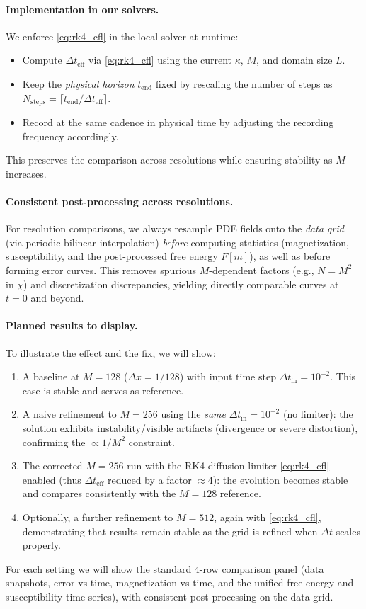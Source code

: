 \documentclass[11pt,a4paper]{article}
\begin{document}
\paragraph{Implementation in our solvers.} We enforce \eqref{eq:rk4_cfl} in the local solver at runtime:
\begin{itemize}
  \item Compute $\Delta t_\text{eff}$ via \eqref{eq:rk4_cfl} using the current $\kappa$, $M$, and domain size $L$.
  \item Keep the \emph{physical horizon} $t_\text{end}$ fixed by rescaling the number of steps as $N_\text{steps}=\lceil t_\text{end}/\Delta t_\text{eff}\rceil$.
  \item Record at the same cadence in physical time by adjusting the recording frequency accordingly.
\end{itemize}
This preserves the comparison across resolutions while ensuring stability as $M$ increases.

\paragraph{Consistent post-processing across resolutions.} For resolution comparisons, we always resample PDE fields onto the \emph{data grid} (via periodic bilinear interpolation) \emph{before} computing statistics (magnetization, susceptibility, and the post-processed free energy $F[m]$), as well as before forming error curves. This removes spurious $M$-dependent factors (e.g., $N=M^2$ in $\chi$) and discretization discrepancies, yielding directly comparable curves at $t=0$ and beyond.

\paragraph{Planned results to display.} To illustrate the effect and the fix, we will show:
\begin{enumerate}
  \item A baseline at $M=128$ ($\Delta x=1/128$) with input time step $\Delta t_\text{in}=10^{-2}$. This case is stable and serves as reference.
  \item A naive refinement to $M=256$ using the \emph{same} $\Delta t_\text{in}=10^{-2}$ (no limiter): the solution exhibits instability/visible artifacts (divergence or severe distortion), confirming the $\propto 1/M^2$ constraint.
  \item The corrected $M=256$ run with the RK4 diffusion limiter \eqref{eq:rk4_cfl} enabled (thus $\Delta t_\text{eff}$ reduced by a factor $\approx4$): the evolution becomes stable and compares consistently with the $M=128$ reference.
  \item Optionally, a further refinement to $M=512$, again with \eqref{eq:rk4_cfl}, demonstrating that results remain stable as the grid is refined when $\Delta t$ scales properly.
\end{enumerate}
For each setting we will show the standard 4-row comparison panel (data snapshots, error vs time, magnetization vs time, and the unified free-energy and susceptibility time series), with consistent post-processing on the data grid.
\end{document}
